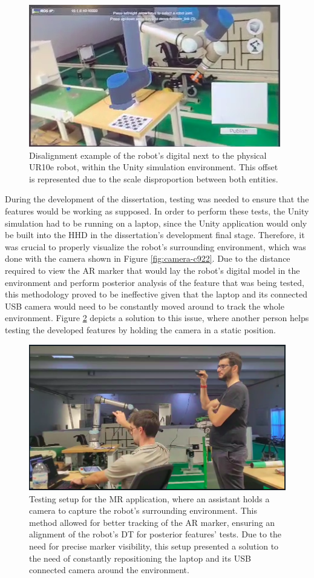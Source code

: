 \begin{figure}[h]
    \centering
    \includegraphics[width=0.7\linewidth]{figs/model-bigger.png}
    \caption{Disalignment example of the robot's digital next to the physical UR10e robot, within the Unity simulation environment. This offset is represented due to the scale disproportion between both entities.}
    \label{fig:bigger-model}
\end{figure}

During the development of the dissertation, testing was needed to ensure that the features would be working as supposed. In order to perform these tests, the Unity simulation had to be running on a laptop, since the Unity application would only be built into the \ac{HHD} in the dissertation's development final stage. Therefore, it was crucial to properly visualize the robot's surrounding environment, which was done with the camera shown in Figure \ref{fig:camera-c922}. Due to the distance required to view the \ac{AR} marker that would lay the robot's digital model in the environment and perform posterior analysis of the feature that was being tested, this methodology proved to be ineffective given that the laptop and its connected \ac{USB} camera would need to be constantly moved around to track the whole environment. Figure \ref{fig:holding-camera} depicts a solution to this issue, where another person helps testing the developed features by holding the camera in a static position.

\begin{figure}[h]
    \centering
    \includegraphics[width=0.7\linewidth]{figs/eu-ze.png}
    \caption{Testing setup for the \ac{MR} application, where an assistant holds a camera to capture the robot's surrounding environment. This method allowed for better tracking of the \ac{AR} marker, ensuring an alignment of the robot’s \ac{DT} for posterior features' tests. Due to the need for precise marker visibility, this setup presented a solution to the need of constantly repositioning the laptop and its \ac{USB} connected camera around the environment.}
    \label{fig:holding-camera}
\end{figure}


